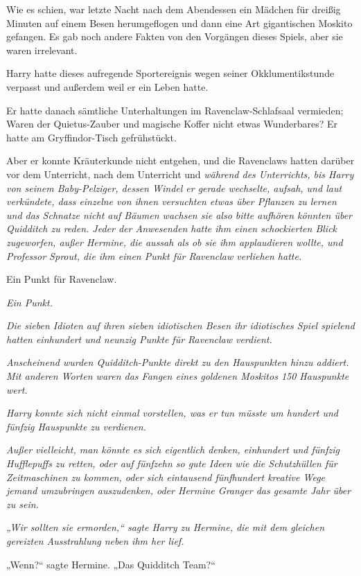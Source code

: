 {Wie es schien, war letzte Nacht nach dem Abendessen ein Mädchen für dreißig Minuten auf einem Besen herumgeflogen und dann eine Art gigantischen Moskito gefangen. Es gab noch andere Fakten von den Vorgängen dieses Spiels, aber sie waren irrelevant.

Harry hatte dieses aufregende Sportereignis wegen seiner Okklumentikstunde verpasst und außerdem weil er ein Leben hatte.

Er hatte danach sämtliche Unterhaltungen im Ravenclaw-Schlafsaal vermieden; Waren der Quietus-Zauber und magische Koffer nicht etwas Wunderbares? Er hatte am Gryffindor-Tisch gefrühstückt.

Aber er konnte Kräuterkunde nicht entgehen, und die Ravenclaws hatten darüber vor dem Unterricht, nach dem Unterricht und \emph{während des Unterrichts, bis Harry von seinem Baby-Pelziger, dessen Windel er gerade wechselte, aufsah, und laut verkündete, dass einzelne von ihnen versuchten etwas über \emph{Pflanzen} zu lernen und das Schnatze nicht auf Bäumen wachsen sie also \emph{bitte} aufhören könnten über Quidditch zu reden. Jeder der Anwesenden hatte ihm einen schockierten Blick zugeworfen, außer Hermine, die aussah als ob sie ihm applaudieren wollte, und Professor Sprout, die ihm einen Punkt für Ravenclaw verliehen hatte.}

Ein Punkt für Ravenclaw.

\emph{Ein Punkt.}

\emph{Die sieben Idioten auf ihren sieben idiotischen Besen ihr idiotisches Spiel spielend hatten einhundert und neunzig Punkte für Ravenclaw verdient.}

\emph{Anscheinend wurden Quidditch-Punkte direkt zu den Hauspunkten hinzu addiert. Mit anderen Worten waren das Fangen eines goldenen Moskitos 150 Hauspunkte wert.}

\emph{Harry konnte sich nicht einmal vorstellen, was er tun müsste um hundert und fünfzig Hauspunkte zu verdienen.}

\emph{Außer vielleicht, man könnte es sich eigentlich denken, einhundert und fünfzig Hufflepuffs zu retten, oder auf fünfzehn so gute Ideen wie die Schutzhüllen für Zeitmaschinen zu kommen, oder sich eintausend fünfhundert kreative Wege jemand umzubringen auszudenken, oder Hermine Granger das gesamte Jahr über zu sein.}

\emph{„Wir sollten sie ermorden,“ sagte Harry zu Hermine, die mit dem gleichen gereizten Ausstrahlung neben ihm her lief.}

„Wenn?“ sagte Hermine. „Das Quidditch Team?“

}
